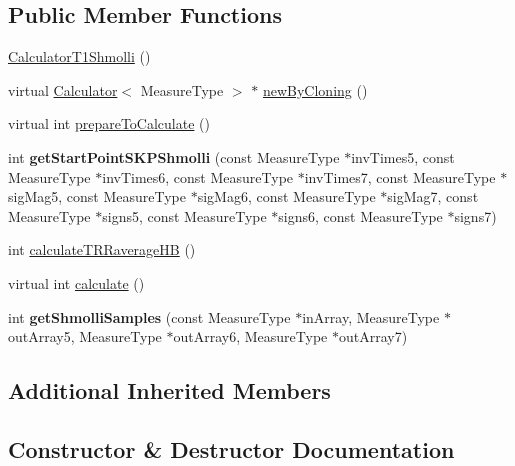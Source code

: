 \subsection*{Public Member Functions}
\begin{DoxyCompactItemize}
\item 
\hyperlink{class_ox_1_1_calculator_t1_shmolli_a693169987cfe715b58c7502b306230f5}{Calculator\+T1\+Shmolli} ()
\item 
virtual \hyperlink{class_ox_1_1_calculator}{Calculator}$<$ Measure\+Type $>$ $\ast$ \hyperlink{class_ox_1_1_calculator_t1_shmolli_a1e4e7b6f59b6a0ca4cbe3ed60452b8e9}{new\+By\+Cloning} ()
\item 
virtual int \hyperlink{class_ox_1_1_calculator_t1_shmolli_a6464c63f20ecd9de842d722e5d9d2866}{prepare\+To\+Calculate} ()
\item 
int {\bfseries get\+Start\+Point\+S\+K\+P\+Shmolli} (const Measure\+Type $\ast$inv\+Times5, const Measure\+Type $\ast$inv\+Times6, const Measure\+Type $\ast$inv\+Times7, const Measure\+Type $\ast$sig\+Mag5, const Measure\+Type $\ast$sig\+Mag6, const Measure\+Type $\ast$sig\+Mag7, const Measure\+Type $\ast$signs5, const Measure\+Type $\ast$signs6, const Measure\+Type $\ast$signs7)\hypertarget{class_ox_1_1_calculator_t1_shmolli_ab44f84d453405c2c61094fc4cd53449c}{}\label{class_ox_1_1_calculator_t1_shmolli_ab44f84d453405c2c61094fc4cd53449c}

\item 
int \hyperlink{class_ox_1_1_calculator_t1_shmolli_a2c4444b1aa40e3f01b7cf0b8e7f7672b}{calculate\+T\+R\+Raverage\+HB} ()
\item 
virtual int \hyperlink{class_ox_1_1_calculator_t1_shmolli_ac689ebbf27f95f6fa2559cc13a824db0}{calculate} ()
\item 
int {\bfseries get\+Shmolli\+Samples} (const Measure\+Type $\ast$in\+Array, Measure\+Type $\ast$out\+Array5, Measure\+Type $\ast$out\+Array6, Measure\+Type $\ast$out\+Array7)\hypertarget{class_ox_1_1_calculator_t1_shmolli_a5e2d8b626c05aebbf816cb0594295b77}{}\label{class_ox_1_1_calculator_t1_shmolli_a5e2d8b626c05aebbf816cb0594295b77}

\end{DoxyCompactItemize}
\subsection*{Additional Inherited Members}


\subsection{Constructor \& Destructor Documentation}
